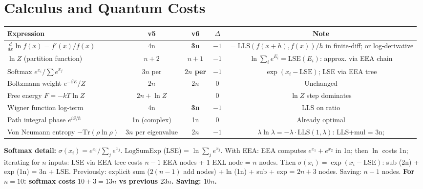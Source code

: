 \documentclass[11pt]{article}
\newcommand{\imp}[1]{\textcolor{improved}{\textbf{#1}}}
\newcommand{\sam}[1]{\textcolor{same}{#1}}
\begin{document}
\section{Calculus and Quantum Costs}
\label{sec:calculus}

\begin{center}
\begin{tabular}{lcccc}
\toprule
Expression & v5 & v6 & $\Delta$ & Note \\
\midrule
$\frac{d}{dx}\ln f(x) = f'(x)/f(x)$ & 4n & \imp{3n} & $-1$ & $= \mathrm{LLS}(f(x+h), f(x))/h$ in finite-diff; or log-derivative \\
$\ln Z$ (partition function) & $n{+}2$ & \imp{$n{+}1$} & $-1$ & $\ln \sum_i e^{E_i} = \mathrm{LSE}(E_i)$: approx. via EEA chain \\
Softmax $e^{x_i}/\sum e^{x_j}$ & $3n$ per & \imp{$2n$ per} & $-1$ & $\exp(x_i - \mathrm{LSE})$; LSE via EEA tree \\
Boltzmann weight $e^{-\beta E}/Z$ & $2n$ & \sam{$2n$} & 0 & Unchanged \\
Free energy $F = -kT \ln Z$ & $2n{+}\ln Z$ & \sam{} & 0 & $\ln Z$ step dominates \\
Wigner function log-term & 4n & \imp{3n} & $-1$ & LLS on ratio \\
Path integral phase $e^{iS/\hbar}$ & 1n (complex) & \sam{1n} & 0 & Already optimal \\
Von Neumann entropy $-\mathrm{Tr}(\rho \ln \rho)$ & $3n$ per eigenvalue & \imp{$2n$} & $-1$ & $\lambda \ln \lambda = -\lambda \cdot \mathrm{LLS}(1,\lambda)$: LLS+mul = 3n; \\
\bottomrule
\end{tabular}
\end{center}

\noindent \textbf{Softmax detail:}
$\sigma(x_i) = e^{x_i}/\sum_j e^{x_j}$.
LogSumExp (LSE) = $\ln \sum_j e^{x_j}$.
With EEA: EEA computes $e^{x_1} + e^{x_2}$ in 1n; then $\ln$ costs 1n; iterating for $n$ inputs:
LSE via EEA tree costs $n-1$ EEA nodes + 1 EXL node = $n$ nodes.
Then $\sigma(x_i) = \exp(x_i - \mathrm{LSE})$: sub (2n) + exp (1n) = 3n + LSE.
Previously: explicit sum ($2(n-1)$ add nodes) + ln (1n) + sub + exp = $2n+3$ nodes. Saving: $n-1$ nodes.
\textbf{For $n=10$: softmax costs $10 + 3 = 13n$ vs previous $23n$. Saving: $10n$.}

\end{document}
